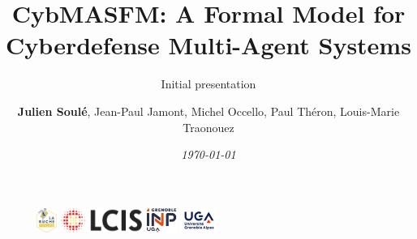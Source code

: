 \author{\textbf{Julien Soulé}, Jean-Paul Jamont, Michel Occello, Paul Théron, Louis-Marie Traonouez}

\title{\textbf{CybMASFM: A Formal Model for Cyberdefense Multi-Agent Systems}}

\subtitle{Initial presentation}



\date{\textit{\footnotesize \today}}

\begin{frame}[plain]
	\maketitle\vspace{-0.8cm}
	\begin{figure}[ht!]
		\centering
            \includegraphics[height=0.8cm]{figures/la-ruche_logo.png}
            \hspace{0.8cm}
            \includegraphics[height=0.8cm]{figures/lcis_logo.png}
            \hspace{0.8cm}
		\includegraphics[height=0.8cm]{figures/grenoble-inp_logo.png}
            \hspace{0.8cm}
            \includegraphics[height=0.8cm]{figures/uga_logo.jpg}
	\end{figure}
\end{frame}